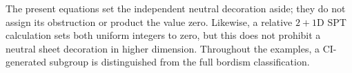 The present equations set the independent neutral decoration aside; they do not assign its obstruction or product the value zero. Likewise, a relative $2+1$D SPT calculation sets both uniform integers to zero, but this does not prohibit a neutral sheet decoration in higher dimension. Throughout the examples, a CI-generated subgroup is distinguished from the full bordism classification.
